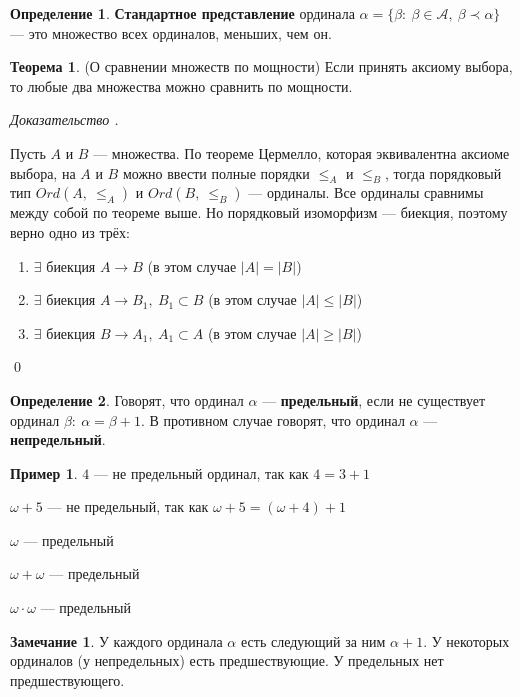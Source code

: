 \documentclass[12pt,oneside]{article}
\theoremstyle{definition}
\newtheorem{definition}{Определение}
\newtheorem{exmp}{Пример}[section]
\newtheorem{theorem}{Теорема}[section]
\newtheorem{remark}{Замечание}[section]
\newenvironment{ourproof}[1]{\textit{Доказательство #1.}}{\qed}
\begin{document}
\begin{definition}
\textbf{Стандартное представление} ординала $\alpha = \{\beta:\ \beta\in\mathcal{A},\ \beta \prec \alpha\}$ --- это множество всех ординалов, меньших, чем он.
\end{definition}

\begin{theorem}\label{srav_po_mosh} (О сравнении множеств по мощности)
Если принять аксиому выбора, то любые два множества можно сравнить по мощности.

\begin{ourproof}{}

Пусть $A$ и $B$ --- множества. По теореме Цермелло, которая эквивалентна аксиоме выбора, на $A$ и $B$ можно ввести полные порядки $\leqslant_A$ и $\leqslant_B$, тогда порядковый тип $Ord(A,\ \leqslant_A)$ и $Ord(B,\ \leqslant_B)$ --- ординалы. Все ординалы сравнимы между собой по теореме выше. Но порядковый изоморфизм --- биекция, поэтому верно одно из трёх:
\begin{enumerate}
    \item $\exists $ биекция $A \longrightarrow B$ (в этом случае $|A| = |B|$)
    \item $\exists $ биекция $A \longrightarrow B_1,\ B_1\subset B$ (в этом случае $|A| \leqslant |B|$)
    \item $\exists $ биекция $B \longrightarrow A_1,\ A_1\subset A$ (в этом случае $|A| \geqslant |B|$)
\end{enumerate}
\end{ourproof}
\end{theorem}

\begin{definition}
Говорят, что ординал $\alpha$ --- \textbf{предельный}, если не существует ординал $\beta:\ \alpha = \beta + 1$. В противном случае говорят, что ординал $\alpha$ --- \textbf{непредельный}.
\end{definition}

\begin{exmp}
 $4$ --- не предельный ординал, так как $4 = 3 + 1$
 
 $\omega + 5$ --- не предельный, так как $\omega + 5 = (\omega + 4) + 1$
 
 $\omega$ --- предельный
 
 $\omega +\omega$ --- предельный
 
 $\omega\cdot\omega$ --- предельный
\end{exmp}

\begin{remark}
У каждого ординала $\alpha$ есть следующий за ним $\alpha + 1$. У некоторых ординалов (у непредельных) есть предшествующие. У предельных нет предшествующего.
\end{remark}
\end{document}
